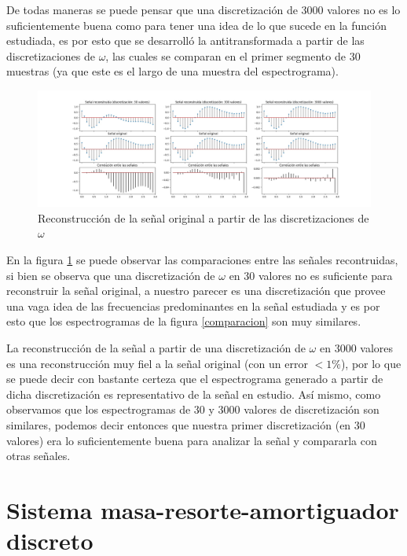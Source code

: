 \documentclass{article}
\begin{document}
De todas maneras se puede pensar que una discretización de 3000 valores no es lo suficientemente buena como para tener una idea de lo que sucede en la función estudiada, es por esto que se desarrolló la antitransformada
a partir de las discretizaciones de $\omega$, las cuales se comparan en el primer segmento de 30 muestras (ya que este es el largo de una muestra del espectrograma).
	         \begin{figure}[h!]
	            \centering
	            \includegraphics[width=\textwidth]{./Imagenes/antitransformada/comparacion.jpg}
	            \caption{Reconstrucción de la señal original a partir de las discretizaciones de $\omega$}
	            \label{recreacion}
	        \end{figure}
En la figura \ref{recreacion} se puede observar las comparaciones entre las señales recontruidas, si bien se observa que una discretización de $\omega$ en 30 valores no es suficiente para reconstruir la señal original,
a nuestro parecer es una discretización que provee una vaga idea de las frecuencias predominantes en la señal estudiada y es por esto que los espectrogramas de la figura \ref{comparacion} son muy similares.

La reconstrucción de la señal a partir de una discretización de $\omega$ en 3000 valores es una reconstrucción muy fiel a la señal original (con un error $<1\%$), por lo que se puede decir con bastante certeza que el espectrograma generado a partir de dicha discretización es representativo de la señal en estudio.
Así mismo, como observamos que los espectrogramas de 30 y 3000 valores de discretización son similares, podemos decir entonces que nuestra primer discretización (en 30 valores) era lo suficientemente buena para analizar la señal y compararla con otras señales.
	        
\newpage \section{Sistema masa-resorte-amortiguador discreto}
\end{document}
